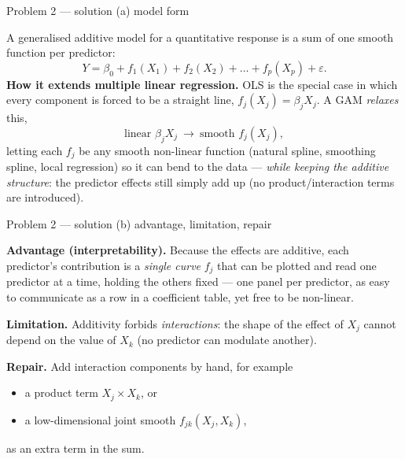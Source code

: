 \documentclass[aspectratio=169,11pt]{beamer}
\begin{document}
\begin{frame}{Problem 2 --- solution (a) model form}
  \begin{solutionbox}
    A generalised additive model for a quantitative response is a sum of one smooth function per
    predictor:
    \[
      Y=\beta_0+f_1(X_1)+f_2(X_2)+\dots+f_p(X_p)+\varepsilon .
    \]
    \textbf{How it extends multiple linear regression.} OLS is the special case in which every
    component is forced to be a straight line, $f_j(X_j)=\beta_jX_j$. A GAM \emph{relaxes} this,
    \[
      \text{linear } \beta_jX_j \ \longrightarrow\ \text{smooth } f_j(X_j),
    \]
    letting each $f_j$ be any smooth non-linear function (natural spline, smoothing spline, local
    regression) so it can bend to the data --- \emph{while keeping the additive structure}: the
    predictor effects still simply add up (no product/interaction terms are introduced).
  \end{solutionbox}
\end{frame}

\begin{frame}{Problem 2 --- solution (b) advantage, limitation, repair}
  \begin{solutionbox}[Solution P2(b)]
    \textbf{Advantage (interpretability).} Because the effects are additive, each predictor's
    contribution is a \emph{single curve} $f_j$ that can be plotted and read one predictor at a
    time, holding the others fixed --- one panel per predictor, as easy to communicate as a row
    in a coefficient table, yet free to be non-linear.
    \medskip

    \textbf{Limitation.} Additivity forbids \emph{interactions}: the shape of the effect of $X_j$
    cannot depend on the value of $X_k$ (no predictor can modulate another).
    \medskip

    \textbf{Repair.} Add interaction components by hand, for example
    \begin{itemize}
      \item a product term $X_j\times X_k$, or
      \item a low-dimensional joint smooth $f_{jk}(X_j,X_k)$,
    \end{itemize}
    as an extra term in the sum.
  \end{solutionbox}
\end{frame}
\end{document}
